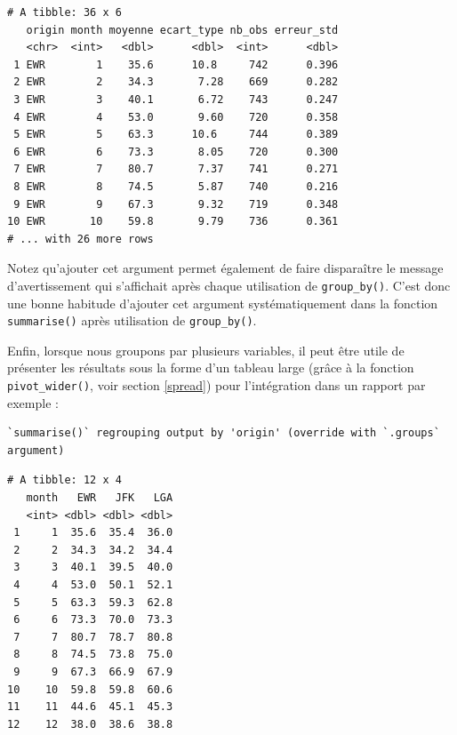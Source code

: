 \documentclass[
  a4paper,
]{article}
\newenvironment{Shaded}{\begin{snugshade}}{\end{snugshade}}
\newcommand{\DataTypeTok}[1]{\textcolor[rgb]{0.00,0.34,0.68}{#1}}
\newcommand{\KeywordTok}[1]{\textcolor[rgb]{0.12,0.11,0.11}{\textbf{#1}}}
\newcommand{\NormalTok}[1]{\textcolor[rgb]{0.12,0.11,0.11}{#1}}
\newcommand{\OperatorTok}[1]{\textcolor[rgb]{0.12,0.11,0.11}{#1}}
\newcommand{\OtherTok}[1]{\textcolor[rgb]{0.00,0.43,0.16}{#1}}
\newcommand{\StringTok}[1]{\textcolor[rgb]{0.75,0.01,0.01}{#1}}
\begin{document}
\begin{verbatim}
# A tibble: 36 x 6
   origin month moyenne ecart_type nb_obs erreur_std
   <chr>  <int>   <dbl>      <dbl>  <int>      <dbl>
 1 EWR        1    35.6      10.8     742      0.396
 2 EWR        2    34.3       7.28    669      0.282
 3 EWR        3    40.1       6.72    743      0.247
 4 EWR        4    53.0       9.60    720      0.358
 5 EWR        5    63.3      10.6     744      0.389
 6 EWR        6    73.3       8.05    720      0.300
 7 EWR        7    80.7       7.37    741      0.271
 8 EWR        8    74.5       5.87    740      0.216
 9 EWR        9    67.3       9.32    719      0.348
10 EWR       10    59.8       9.79    736      0.361
# ... with 26 more rows
\end{verbatim}

Notez qu'ajouter cet argument permet également de faire disparaître le message d'avertissement qui s'affichait après chaque utilisation de \texttt{group\_by()}. C'est donc une bonne habitude d'ajouter cet argument systématiquement dans la fonction \texttt{summarise()} après utilisation de \texttt{group\_by()}.

Enfin, lorsque nous groupons par plusieurs variables, il peut être utile de présenter les résultats sous la forme d'un tableau large (grâce à la fonction \texttt{pivot\_wider()}, voir section \ref{spread}) pour l'intégration dans un rapport par exemple :

\begin{Shaded}
\end{Shaded}

\begin{verbatim}
`summarise()` regrouping output by 'origin' (override with `.groups` argument)
\end{verbatim}

\begin{verbatim}
# A tibble: 12 x 4
   month   EWR   JFK   LGA
   <int> <dbl> <dbl> <dbl>
 1     1  35.6  35.4  36.0
 2     2  34.3  34.2  34.4
 3     3  40.1  39.5  40.0
 4     4  53.0  50.1  52.1
 5     5  63.3  59.3  62.8
 6     6  73.3  70.0  73.3
 7     7  80.7  78.7  80.8
 8     8  74.5  73.8  75.0
 9     9  67.3  66.9  67.9
10    10  59.8  59.8  60.6
11    11  44.6  45.1  45.3
12    12  38.0  38.6  38.8
\end{verbatim}
\end{document}
